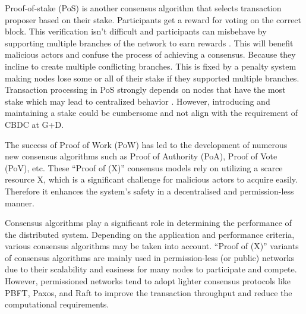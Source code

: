 \documentclass[
  english,        %
  font=times,     %
  onecolumn,      %
]{tumarticle}
\begin{document}
\hspace{1em} Proof-of-stake (PoS) is another consensus algorithm that selects transaction proposer based on their stake. Participants get a reward for voting on the correct block. This verification isn't difficult and participants can misbehave by supporting multiple branches of the network to earn rewards \cite{lepore2020survey}. This will benefit malicious actors and confuse the process of achieving a consensus. Because they incline to create multiple conflicting branches. This is fixed by a penalty system making nodes lose some or all of their stake if they supported multiple branches. Transaction processing in PoS strongly depends on nodes that have the most stake which may lead to centralized behavior \cite{bamakan2020survey}. However, introducing and maintaining a stake could be cumbersome and not align with the requirement of CBDC at G+D. 

\hspace{1em} The success of Proof of Work (PoW) has led to the development of numerous new consensus algorithms such as Proof of Authority (PoA), Proof of Vote (PoV), etc. These “Proof of (X)” consensus models rely on utilizing a scarce resource X, which is a significant challenge for malicious actors to acquire easily. Therefore it enhances the system's safety in a decentralised and permission-less manner.

\hspace{1em} Consensus algorithms play a significant role in determining the performance of the distributed system. Depending on the application and performance criteria, various consensus algorithms may be taken into account.  “Proof of (X)” variants of consensus algorithms are mainly used in permission-less (or public) networks due to their scalability and easiness for many nodes to participate and compete. However, permissioned networks tend to adopt lighter consensus protocols like PBFT, Paxos, and Raft \cite{li2020scalable} to improve the transaction throughput and reduce the computational requirements. 
\end{document}
